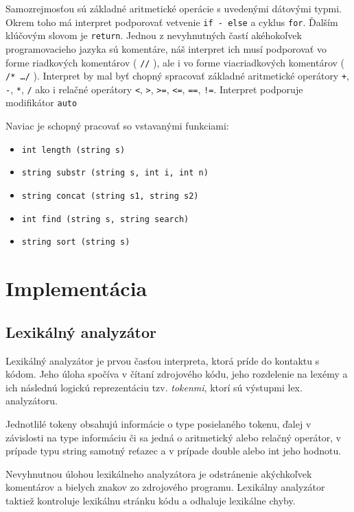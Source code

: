 \documentclass[12pt,a4paper,titlepage,final]{article}
\begin{document}
Samozrejmosťou sú základné aritmetické operácie s uvedenými dátovými typmi. Okrem toho má interpret podporovať vetvenie \texttt{if - else} a cyklus \texttt{for}. Ďalším klúčovým slovom je \texttt{return}. Jednou z nevyhnutných častí akéhokoľvek programovacieho jazyka sú komentáre, náš interpret ich musí podporovať vo forme riadkových komentárov ( \texttt{//} ), ale i vo forme viacriadkových komentárov ( \texttt{/* \ldots */} ). 
Interpret by mal byť chopný spracovať základné aritmetické operátory \texttt{+}, \texttt{-}, \texttt{*}, \texttt{/} ako i relačné operátory \texttt{<}, \texttt{>}, \texttt{>=}, \texttt{<=}, \texttt{==}, \texttt{!=}.
Interpret podporuje modifikátor \texttt{auto}

Naviac  je schopný pracovať so vstavanými funkciami:

\begin{itemize}
\item \texttt{int length (string s)}
\item \texttt{string substr (string s, int i, int n)}
\item \texttt{string concat (string s1, string s2)}
\item \texttt{int find (string s, string search)}
\item \texttt{string sort (string s)}
\end{itemize}

\section{Implementácia} \label{implementace}

\subsection{Lexikálný analyzátor}
Lexikálný analyzátor je prvou časťou interpreta, ktorá príde do kontaktu s kódom. Jeho úloha spočíva
v čítaní zdrojového kódu, jeho rozdelenie na lexémy a ich následnú logickú reprezentáciu tzv.
\textit{tokenmi}, ktorí sú výstupmi lex. analyzátoru.

Jednotlilé tokeny obsahujú informácie o type posielaného tokenu, ďalej v závislosti na type
informáciu či sa jedná o aritmetický alebo relačný operátor, v prípade typu string samotný reťazec
a v prípade double alebo int jeho hodnotu.

Nevyhnutnou úlohou lexikálneho analyzátora je odstránenie akýchkoľvek komentárov a bielych
znakov zo zdrojového programu. Lexikálny analyzátor taktiež kontroluje lexikálnu stránku kódu
a odhaluje lexikálne chyby.
\end{document}
